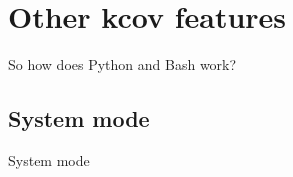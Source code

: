 \documentclass{beamer}
\begin{document}
\section{Other kcov features}

\begin{frame}{So how does Python and Bash work?}
\end{frame}

\subsection{System mode}
\begin{frame}{System mode}
\end{frame}
\end{document}
